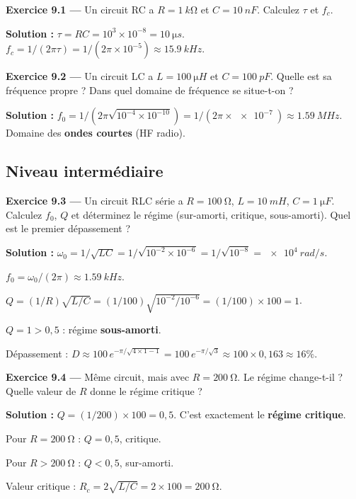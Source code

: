 \documentclass[12pt,a4paper,twoside]{book}
\begin{document}
\textbf{Exercice 9.1 ---} Un circuit RC a $R = \SI{1}{k\ohm}$ et $C = \SI{10}{nF}$. Calculez $\tau$ et $f_c$.

\begin{pratique}
\textbf{Solution :} $\tau = RC = 10^3 \times 10^{-8} = \SI{10}{\micro s}$. $f_c = 1/(2\pi\tau) = 1/(2\pi\times10^{-5}) \approx \SI{15.9}{kHz}$.
\end{pratique}

\textbf{Exercice 9.2 ---} Un circuit LC a $L = \SI{100}{\micro H}$ et $C = \SI{100}{pF}$. Quelle est sa fréquence propre ? Dans quel domaine de fréquence se situe-t-on ?

\begin{pratique}
\textbf{Solution :} $f_0 = 1/(2\pi\sqrt{10^{-4}\times10^{-10}}) = 1/(2\pi\times\SI{e-7}{}) \approx \SI{1.59}{MHz}$. Domaine des \textbf{ondes courtes} (HF radio).
\end{pratique}

\subsection*{Niveau intermédiaire}

\textbf{Exercice 9.3 ---} Un circuit RLC série a $R = \SI{100}{\ohm}$, $L = \SI{10}{mH}$, $C = \SI{1}{\micro F}$. Calculez $f_0$, $Q$ et déterminez le régime (sur-amorti, critique, sous-amorti). Quel est le premier dépassement ?

\begin{pratique}
\textbf{Solution :} $\omega_0 = 1/\sqrt{LC} = 1/\sqrt{10^{-2}\times10^{-6}} = 1/\sqrt{10^{-8}} = \SI{e4}{rad/s}$.

$f_0 = \omega_0/(2\pi) \approx \SI{1.59}{kHz}$.

$Q = (1/R)\sqrt{L/C} = (1/100)\sqrt{10^{-2}/10^{-6}} = (1/100)\times100 = 1$.

$Q = 1 > 0{,}5$ : régime \textbf{sous-amorti}.

Dépassement : $D \approx 100\,e^{-\pi/\sqrt{4\times1-1}} = 100\,e^{-\pi/\sqrt{3}} \approx 100\times0{,}163 \approx 16\%$.
\end{pratique}

\textbf{Exercice 9.4 ---} Même circuit, mais avec $R = \SI{200}{\ohm}$. Le régime change-t-il ? Quelle valeur de $R$ donne le régime critique ?

\begin{pratique}
\textbf{Solution :} $Q = (1/200)\times100 = 0{,}5$. C'est exactement le \textbf{régime critique}.

Pour $R = \SI{200}{\ohm}$ : $Q = 0{,}5$, critique.

Pour $R > \SI{200}{\ohm}$ : $Q < 0{,}5$, sur-amorti.

Valeur critique : $R_c = 2\sqrt{L/C} = 2\times100 = \SI{200}{\ohm}$. \checkmark
\end{pratique}
\end{document}
